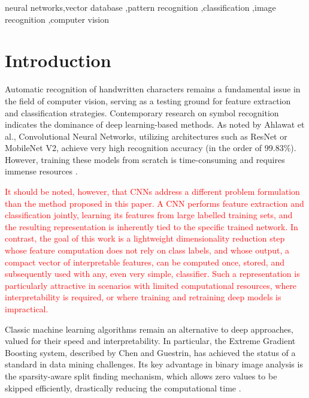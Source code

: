 \documentclass[a4paper,fleqn]{cas-dc}
\begin{document}

\begin{keywords}
 neural networks\sep vector database \sep pattern recognition \sep classification \sep image recognition \sep computer vision
\end{keywords}

\maketitle

\section{Introduction}

Automatic recognition of handwritten characters remains a fundamental issue in the field of computer vision, serving as a testing ground for feature extraction and classification strategies. Contemporary research on symbol recognition indicates the dominance of deep learning-based methods. As noted by Ahlawat et al., Convolutional Neural Networks, utilizing architectures such as ResNet or MobileNet V2, achieve very high recognition accuracy (in the order of 99.83\%). However, training these models from scratch is time-consuming and requires immense resources \cite{ahlawat2020}.

\textcolor{red}{It should be noted, however, that CNNs address a different problem formulation than the method proposed in this paper. A CNN performs feature extraction and classification jointly, learning its features from large labelled training sets, and the resulting representation is inherently tied to the specific trained network. In contrast, the goal of this work is a lightweight dimensionality reduction step whose feature computation does not rely on class labels, and whose output, a compact vector of interpretable features, can be computed once, stored, and subsequently used with any, even very simple, classifier. Such a representation is particularly attractive in scenarios with limited computational resources, where interpretability is required, or where training and retraining deep models is impractical.}

Classic machine learning algorithms remain an alternative to deep approaches, valued for their speed and interpretability. In particular, the Extreme Gradient Boosting system, described by Chen and Guestrin, has achieved the status of a standard in data mining challenges. Its key advantage in binary image analysis is the sparsity-aware split finding mechanism, which allows zero values to be skipped efficiently, drastically reducing the computational time \cite{chen2016}.
\end{document}
